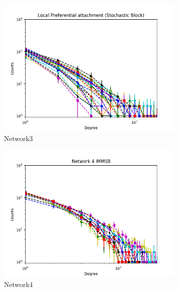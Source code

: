\begin{figure}[h]
\begin{subfigure}[b]{0.300\textwidth}
            \centering
            \includegraphics[width=\textwidth]{img/corpus/immsb_network3_1}
            \caption {{\small Network3}}    
        \end{subfigure}
        \begin{subfigure}[b]{0.300\textwidth}
            \centering
            \includegraphics[width=\textwidth]{img/corpus/immsb_network4_1}
            \caption {{\small Network4}}    
        \end{subfigure}
        \begin{subfigure}[b]{0.300\textwidth}
            \centering

\end{subfigure}
\end{figure}
